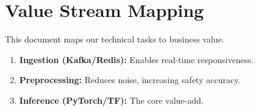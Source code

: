 \documentclass[
]{report}
\author{}
\date{}
\providecommand{\tightlist}{%
  \setlength{\itemsep}{0pt}\setlength{\parskip}{0pt}}
\begin{document}
\newcommand{\theProjectName}{NOAA}
\newcommand{\theAuthor}{Rodrigo Souza dos Santos}

\chapter{Value Stream Mapping}\label{value-stream-mapping}

This document maps our technical tasks to business value.

\begin{enumerate}
\def\labelenumi{\arabic{enumi}.}
\tightlist
\item
  \textbf{Ingestion (Kafka/Redis):} Enables real-time responsiveness.
\item
  \textbf{Preprocessing:} Reduces noise, increasing safety accuracy.
\item
  \textbf{Inference (PyTorch/TF):} The core value-add.
\end{enumerate}
\end{document}
